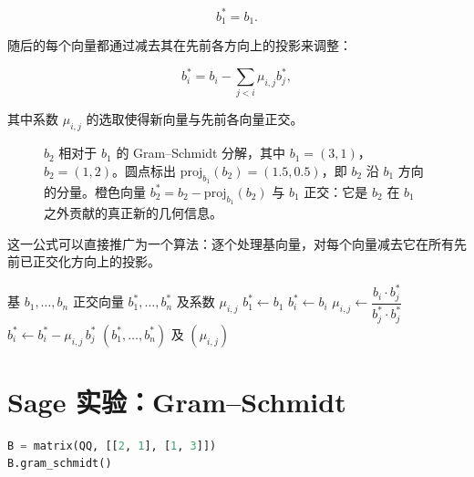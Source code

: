 \[
b_1^* = b_1.
\]

随后的每个向量都通过减去其在先前各方向上的投影来调整：

\[
b_i^* = b_i - \sum_{j<i} \mu_{i,j} b_j^*,
\]

其中系数 $\mu_{i,j}$ 的选取使得新向量与先前各向量正交。

\begin{figure}[H]
\centering
{}
\caption{$b_2$ 相对于 $b_1$ 的 Gram--Schmidt 分解，其中 $b_1=(3,1)$，$b_2=(1,2)$。圆点标出 $\mathrm{proj}_{b_1}(b_2)=(1.5,0.5)$，即 $b_2$ 沿 $b_1$ 方向的分量。橙色向量 $b_2^{*}=b_2-\mathrm{proj}_{b_1}(b_2)$ 与 $b_1$ 正交：它是 $b_2$ 在 $b_1$ 之外贡献的真正新的几何信息。}
\label{fig:gram-schmidt}
\end{figure}

这一公式可以直接推广为一个算法：逐个处理基向量，对每个向量减去它在所有先前已正交化方向上的投影。

\begin{algorithm}[H]
\caption{Gram--Schmidt 正交化}
\label{alg:gram-schmidt}
\begin{algorithmic}[1]
\Require 基 $b_1,\dots,b_n$
\Ensure 正交向量 $b_1^*,\dots,b_n^*$ 及系数 $\mu_{i,j}$
\State $b_1^* \gets b_1$
    \State $b_i^* \gets b_i$
        \State $\mu_{i,j} \gets \dfrac{b_i \cdot b_j^*}{b_j^* \cdot b_j^*}$
        \State $b_i^* \gets b_i^* - \mu_{i,j}\, b_j^*$
    \EndFor
\EndFor
\State \Return $(b_1^*,\dots,b_n^*)$ 及 $(\mu_{i,j})$
\end{algorithmic}
\end{algorithm}

\section{Sage 实验：Gram--Schmidt}

\begin{lstlisting}[language=Python]
B = matrix(QQ, [[2, 1], [1, 3]])
B.gram_schmidt()
\end{lstlisting}


